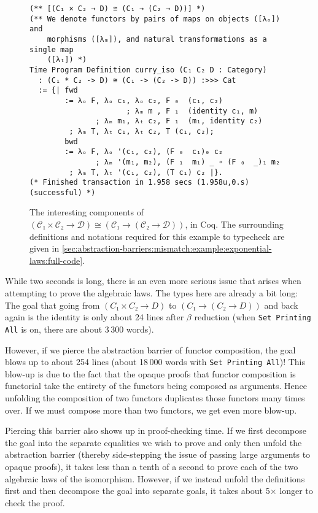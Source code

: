 \begin{figure}
\begin{verbatim}
(** [(C₁ × C₂ → D) ≅ (C₁ → (C₂ → D))] *)
(** We denote functors by pairs of maps on objects ([λₒ]) and
    morphisms ([λₘ]), and natural transformations as a single map
    ([λₜ]) *)
Time Program Definition curry_iso (C₁ C₂ D : Category)
  : (C₁ * C₂ -> D) ≅ (C₁ -> (C₂ -> D)) :>>> Cat
  := {| fwd
        := λₒ F, λₒ c₁, λₒ c₂, F ₀  (c₁, c₂)
                      ; λₘ m , F ₁  (identity c₁, m)
               ; λₘ m₁, λₜ c₂, F ₁  (m₁, identity c₂)
         ; λₘ T, λₜ c₁, λₜ c₂, T (c₁, c₂);
        bwd
        := λₒ F, λₒ '(c₁, c₂), (F ₀  c₁)₀ c₂
               ; λₘ '(m₁, m₂), (F ₁  m₁) _ ∘ (F ₀  _)₁ m₂
         ; λₘ T, λₜ '(c₁, c₂), (T c₁) c₂ |}.
(* Finished transaction in 1.958 secs (1.958u,0.s) (successful) *)
\end{verbatim}
  \caption{%
    \label{fig:exponential-laws:def:math}%
    The interesting components of $(\mathcal C₁ × \mathcal C₂ → \mathcal D) ≅ (\mathcal C₁ → (\mathcal C₂ → \mathcal D))$, in Coq.
    The surrounding definitions and notations required for this example to typecheck are given in \autoref{sec:abstraction-barriers:mismatch:example:exponential-laws:full-code}.%
  }
\end{figure}

While two seconds is long, there is an even more serious issue that arises when attempting to prove the algebraic laws.
The types here are already a bit long:
The goal that going from $(C₁ × C₂ → D)$ to $(C₁ → (C₂ → D))$ and back again is the identity is only about 24 lines after $\beta$ reduction (when \texttt{Set Printing All} is on, there are about 3\,300 words).

However, if we pierce the abstraction barrier of functor composition, the goal blows up to about 254 lines (about 18\,000 words with \texttt{Set Printing All})!
This blow-up is due to the fact that the opaque proofs that functor composition is functorial take the entirety of the functors being composed as arguments.
Hence unfolding the composition of two functors duplicates those functors many times over.
If we must compose more than two functors, we get even more blow-up.

Piercing this barrier also shows up in proof-checking time.
If we first decompose the goal into the separate equalities we wish to prove and only then unfold the abstraction barrier (thereby side-stepping the issue of passing large arguments to opaque proofs), it takes less than a tenth of a second to prove each of the two algebraic laws of the isomorphism.
However, if we instead unfold the definitions first and then decompose the goal into separate goals, it takes about 5$\times$ longer to check the proof.

